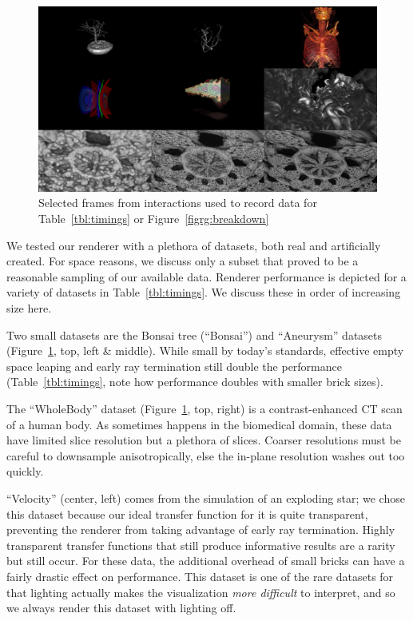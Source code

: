 \begin{figure}
  \centering
  \includegraphics[width=0.98\linewidth]{images/rg/perFramesSmall.png}
  \caption{Selected frames from interactions used to record data for
  Table~\ref{tbl:timings} or Figure~\ref{figrg:breakdown}}
  \label{figrg:perFrames}
\end{figure}

We tested our renderer with a plethora of datasets, both real and
artificially created.  For space reasons, we discuss only a subset that
proved to be a reasonable sampling of our available data.
Renderer performance is depicted for a variety of datasets in
Table~\ref{tbl:timings}.  We discuss these in order of increasing size
here.

Two small datasets are the Bonsai tree (``Bonsai'') and ``Aneurysm''
datasets (Figure~\ref{figrg:perFrames}, top, left \& middle). While
small by today's standards, effective empty space leaping and early ray
termination still double the performance
(Table~\ref{tbl:timings}, note how performance doubles with smaller
brick sizes).

The ``WholeBody'' dataset (Figure~\ref{figrg:perFrames}, top, right) is
a contrast-enhanced CT scan of a human body.  As sometimes happens in
the biomedical domain, these data have limited slice resolution but a
plethora of slices.  Coarser resolutions must be careful to downsample
anisotropically, else the in-plane resolution washes out too quickly.

``Velocity'' (center, left) comes from the simulation of an exploding
star; we chose this dataset because our ideal transfer function for it
is quite transparent, preventing the renderer from taking advantage of
early ray termination.  Highly transparent transfer functions that
still produce informative results are a rarity but still occur.  For
these data, the additional overhead of small bricks can have a fairly
drastic effect on performance.  This dataset is one of the rare datasets
for that lighting actually makes the visualization \emph{more
difficult} to interpret, and so we always render this dataset with
lighting off.

